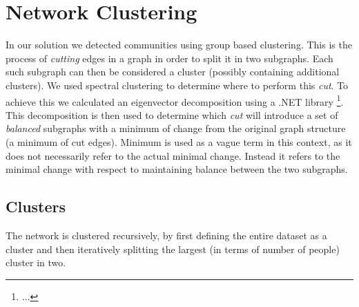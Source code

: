 \chapter{Network Clustering}
In our solution we detected communities using group based clustering.
This is the process of \textit{cutting} edges in a graph in order to split it in two subgraphs.
Each such subgraph can then be considered a cluster (possibly containing additional clusters).
We used spectral clustering to determine where to perform this \textit{cut}.
To achieve this we calculated an eigenvector decomposition using a .NET library \footnote{...}.
This decomposition is then used to determine which \textit{cut} will introduce a set of \textit{balanced} subgraphs with a minimum of change from the original graph structure (a minimum of cut edges).
Minimum is used as a vague term in this context, as it does not necessarily refer to the actual minimal change.
Instead it refers to the minimal change with respect to maintaining balance between the two subgraphs.

\section{Clusters}
The network is clustered recursively, by first defining the entire dataset as a cluster and then iteratively splitting the largest (in terms of number of people) cluster in two.



